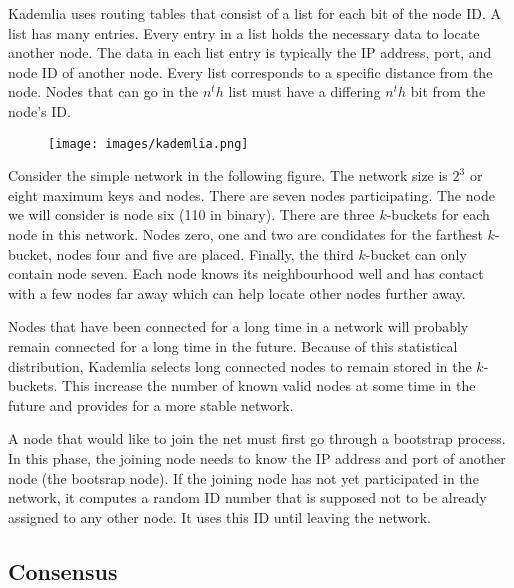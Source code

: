 \documentclass{article}
\begin{document}
Kademlia uses routing tables that consist of a list for each bit of the node ID. A list has many entries. Every entry in a list holds the necessary data to locate another node. The data in each list entry is typically the IP address, port, and node ID of another node. Every list corresponds to a specific distance from the node. Nodes that can go in the $n^th$ list must have a differing $n^th$ bit from the node's ID.

\begin{figure}[hbt!]
 \centering
\texttt{[image: images/kademlia.png]}
\end{figure}

Consider the simple network in the following figure. The network size is $2^3$ or eight maximum keys and nodes. There are seven nodes participating. The node we will consider is node six (110 in binary). There are three $k$-buckets for each node in this network. Nodes zero, one and two are condidates for the farthest $k$-bucket, nodes four and five are placed. Finally, the third $k$-bucket can only contain node seven. Each node knows its neighbourhood well and has contact with a few nodes far away which can help locate other nodes further away. \newline

Nodes that have been connected for a long time in a network will probably remain connected for a long time in the future. Because of this statistical distribution, Kademlia selects long connected nodes to remain stored in the $k$-buckets. This increase the number of known valid nodes at some time in the future and provides for a more stable network.


A node that would like to join the net must first go through a bootstrap process. In this phase, the joining node needs to know the IP address and port of another node (the bootsrap node). If the joining node has not yet participated in the network, it computes a random ID number that is supposed not to be already assigned to any other node. It uses this ID until leaving the network.


\subsection{Consensus}
\end{document}
